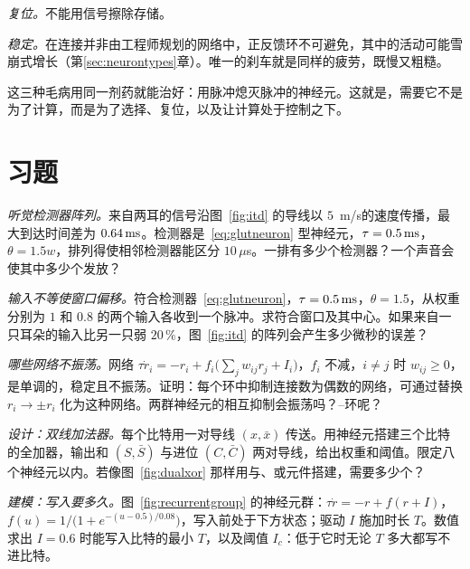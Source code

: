 \emph{复位。}不能用信号擦除存储。

\emph{稳定。}在连接并非由工程师规划的网络中，正反馈环不可避免，其中的活动可能雪崩式增长（第\ref{sec:neurontypes}章）。唯一的刹车就是同样的疲劳，既慢又粗糙。

这三种毛病用同一剂药就能治好：用脉冲熄灭脉冲的神经元。这就是，需要它不是为了计算，而是为了选择、复位，以及让计算处于控制之下。

\section{习题}

\begin{exercise}[\lvlA]
\label{ex:02:1}
\emph{听觉检测器阵列。}来自两耳的信号沿图~\ref{fig:itd} 的导线以 $5$~m/s的速度传播，最大到达时间差为 $0.64\,\text{ms}$。检测器是~\eqref{eq:glutneuron} 型神经元，$\tau=0.5\,\text{ms}$，$\theta=1.5w$，排列得使相邻检测器能区分 $10\,\mu$s。一排有多少个检测器？一个声音会使其中多少个发放？
\end{exercise}

\begin{exercise}[\lvlB]
\label{ex:02:2}
\emph{输入不等使窗口偏移。}符合检测器~\eqref{eq:glutneuron}，$\tau=0.5\,\text{ms}$，$\theta=1.5$，从权重分别为 $1$ 和 $0.8$ 的两个输入各收到一个脉冲。求符合窗口及其中心。如果来自一只耳朵的输入比另一只弱 $20\,\%$，图~\ref{fig:itd} 的阵列会产生多少微秒的误差？
\end{exercise}

\begin{exercise}[\lvlB]
\label{ex:02:3}
\emph{哪些网络不振荡。}网络 $\tau\dot r_i=-r_i+f_i\bigl(\textstyle\sum_jw_{ij}r_j+I_i\bigr)$，$f_i$ 不减，$i\ne j$ 时 $w_{ij}\ge0$，是单调的，稳定且不振荡。证明：每个环中抑制连接数为偶数的网络，可通过替换 $r_i\to\pm r_i$ 化为这种网络。两群神经元的相互抑制会振荡吗？--环呢？
\end{exercise}

\begin{exercise}[\lvlB]
\label{ex:02:4}
\emph{设计：双线加法器。}每个比特用一对导线 $(x,\bar x)$ 传送。用神经元搭建三个比特的全加器，输出和 $(S,\bar S)$ 与进位 $(C,\bar C)$ 两对导线，给出权重和阈值。限定八个神经元以内。若像图~\ref{fig:dualxor} 那样用与、或元件搭建，需要多少个？
\end{exercise}

\begin{exercise}[\lvlB]
\label{ex:02:5}
\emph{建模：写入要多久。}图~\ref{fig:recurrentgroup} 的神经元群：$\tau\dot r=-r+f(r+I)$，$f(u)=1/\bigl(1+e^{-(u-0.5)/0.08}\bigr)$，写入前处于下方状态；驱动 $I$ 施加时长 $T$。数值求出 $I=0.6$ 时能写入比特的最小 $T$，以及阈值 $I_c$：低于它时无论 $T$ 多大都写不进比特。
\end{exercise}

